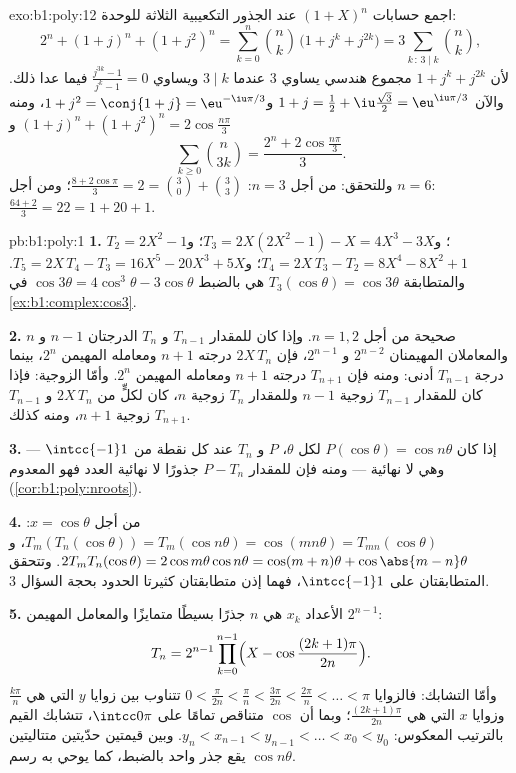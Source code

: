 \begin{solution}{exo:b1:poly:12}
اجمع حسابات $(1 + X)^n$ عند الجذور التكعيبية الثلاثة
للوحدة:
\[
2^n + (1 + j)^n + (1 + j^2)^n
= \sum_{k=0}^n \binom nk\,\bigl(1 + j^k + j^{2k}\bigr)
= 3\sum_{k\,:\,3\mid k}\binom nk ,
\]
لأن $1 + j^k + j^{2k}$ مجموع هندسي يساوي $3$ عندما $3
\mid k$ ويساوي $\frac{j^{3k} - 1}{j^k - 1} = 0$ فيما عدا ذلك. والآن $1 +
j = \frac12 + \iu\frac{\sqrt3}2 = \eu^{\iu\pi/3}$ و$1 + j^2 =
\conj{1 + j} = \eu^{-\iu\pi/3}$، ومنه $(1+j)^n + (1+j^2)^n =
2\cos\frac{n\pi}3$ و
\[
\sum_{k\geq0}\binom n{3k} = \frac{2^n + 2\cos\frac{n\pi}3}{3} .
\]
وللتحقق: من أجل $n = 3$: $\frac{8 + 2\cos\pi}3 = 2 = \binom30 + \binom33$؛
ومن أجل $n = 6$: $\frac{64 + 2}3 = 22 = 1 + 20 + 1$.
\end{solution}

\begin{solution}{pb:b1:poly:1}
\textbf{1.} $T_2 = 2X^2 - 1$؛ و$T_3 = 2X(2X^2 - 1) - X = 4X^3 -
3X$؛ و$T_4 = 2X\,T_3 - T_2 = 8X^4 - 8X^2 + 1$؛ و$T_5 = 2X\,T_4 - T_3
= 16X^5 - 20X^3 + 5X$. والمتطابقة $T_3(\cos\theta) = \cos3\theta$
هي بالضبط $\cos3\theta = 4\cos^3\theta - 3\cos\theta$ في
\cref{ex:b1:complex:cos3}.

\textbf{2.} صحيحة من أجل $n = 1, 2$. وإذا كان للمقدار $T_{n-1}$ و $T_n$ الدرجتان
$n-1$ و $n$ والمعاملان المهيمنان $2^{n-2}$ و $2^{n-1}$، فإن
$2X\,T_n$ درجته $n+1$ ومعامله المهيمن $2^n$، بينما درجة
$T_{n-1}$ أدنى: ومنه فإن $T_{n+1}$ درجته $n + 1$ ومعامله المهيمن
$2^n$. وأمّا الزوجية: فإذا كان للمقدار $T_{n-1}$ زوجية $n - 1$
وللمقدار $T_n$ زوجية $n$، كان لكلٍّ من $2X\,T_n$ و $T_{n-1}$
زوجية $n + 1$، ومنه كذلك $T_{n+1}$.

\textbf{3.} إذا كان $P(\cos\theta) = \cos n\theta$ لكل $\theta$،
 $P$ و $T_n$ عند كل نقطة من $\intcc{-1}1$ --- وهي 
لا نهائية --- ومنه فإن للمقدار $P - T_n$ جذورًا لا نهائية العدد فهو
 المعدوم (\cref{cor:b1:poly:nroots}).

\textbf{4.} من أجل $x = \cos\theta$: $T_m(T_n(\cos\theta)) =
T_m(\cos n\theta) = \cos(mn\theta) = T_{mn}(\cos\theta)$، و
$2T_mT_n(\cos\theta) = 2\cos m\theta\cos n\theta = \cos(m+n)\theta
+ \cos\abs{m - n}\theta$. وتتحقق المتطابقتان على $\intcc{-1}1$،
فهما إذن متطابقتان كثيرتا الحدود بحجة السؤال 3.

\textbf{5.} الأعداد $x_k$ هي $n$ جذرًا بسيطًا متمايزًا والمعامل
المهيمن $2^{n-1}$:
\[
T_n = 2^{n-1}\prod_{k=0}^{n-1}
\Bigl(X - \cos\frac{(2k+1)\pi}{2n}\Bigr) .
\]
وأمّا التشابك: فالزوايا $0 < \frac{\pi}{2n} < \frac\pi n <
\frac{3\pi}{2n} < \frac{2\pi}n < \dots < \pi$ تتناوب بين
زوايا $y$ التي هي $\frac{k\pi}n$ وزوايا $x$ التي هي
$\frac{(2k+1)\pi}{2n}$؛ وبما أن $\cos$ متناقص تمامًا على
$\intcc0\pi$، تتشابك القيم بالترتيب المعكوس: $y_n <
x_{n-1} < y_{n-1} < \dots < x_0 < y_0$. وبين قيمتين حدّيتين متتاليتين يقع
جذر واحد بالضبط، كما يوحي به رسم $\cos n\theta$.


\end{solution}
